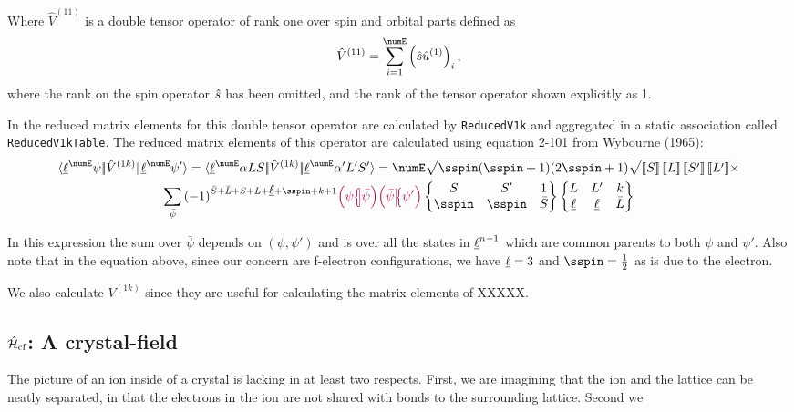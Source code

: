 \documentclass{article}
\begin{document}
Where $\hat{V}^{(11)}$ is a double tensor operator of rank one over spin and orbital parts defined as 
\begin{equation}
    \op{V}^{(11)} = \sum_{i=1}^\numE \left( \op{s}\op{u}^{(1)} \right)_i,
\end{equation}
where the rank on the spin operator $\hat{s}$ has been omitted, and the rank of the tensor operator shown explicitly as 1.

In \qlanth the reduced matrix elements for this double tensor operator are calculated by \texttt{ReducedV1k} and aggregated in a static association called \texttt{ReducedV1kTable}. The reduced matrix elements of this operator are calculated using equation 2-101 from Wybourne (1965):
\begin{multline} 
    \redbraopket{\lorb^\numE \psi}{\op{V}^{(1k)}}{\lorb^\numE \psi'} = 
        \redbraopket{\lorb^\numE \alpha L S}
            {\op{V}^{(1k)}}
            {\lorb^\numE \alpha'L'S'} =
        \numE 
            \sqrt{\sspin (\sspin + 1) (2\sspin + 1)}
            \sqrt{\tpobraket{S}\tpobraket{L}\tpobraket{S'}\tpobraket{L'}} \times \\
    \sum_{\bar{\psi}}
        \phaser{\bar{S} + \bar{L} + S + L + \lorb + \sspin + k + 1}
        \cfpinv{\psi}{\bar{\psi}}
        \cfp{\bar{\psi}}{\psi'}
        \sixj{S}     {S'}     {1}
            {\sspin} {\sspin} {\bar{S}}
        \sixj{L}     {L'}    {k}
             {\lorb} {\lorb} {\bar{L}} 
\end{multline}

In this expression the sum over $\bar{\psi}$ depends on $(\psi,\psi')$ and is over all the states in $\underbar{$\ell$}^{n-1}$ which are common parents to both $\psi$ and $\psi'$. Also note that in the equation above, since our concern are f-electron configurations, we have $\underbar{$\ell$} = 3$ and $\sspin = \frac{1}{2}$ as is due to the electron.

We also calculate $V^{(1k)}$ since they are useful for calculating the matrix elements of XXXXX.  
 
\subsection{$\hat{\mathcal{H}}_\text{cf}$: A crystal-field}

The picture of an ion inside of a crystal is lacking in at least two respects. First, we are imagining that the ion and the lattice can be neatly separated, in that the electrons in the ion are not shared with bonds to the surrounding lattice. Second we
\end{document}
